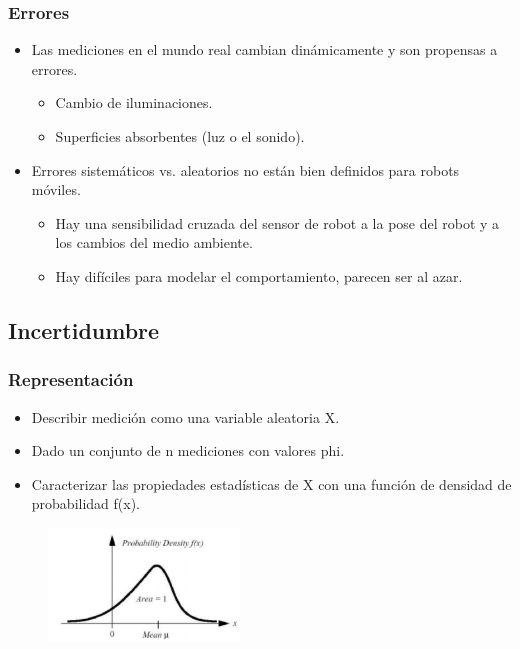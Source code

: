 \documentclass{beamer}
\begin{document}
\begin{frame}
\frametitle{Errores}
\begin{itemize}
\item Las mediciones en el mundo real cambian dinámicamente y son propensas a errores.
\begin{itemize}
\item Cambio de iluminaciones.
\item Superficies absorbentes (luz o el sonido).
\end{itemize}
\item Errores sistemáticos vs. aleatorios no están bien definidos para robots móviles.
\begin{itemize}
\item Hay una sensibilidad cruzada del sensor de robot a la pose del robot y a los cambios del medio ambiente.
\item Hay difíciles para modelar el comportamiento, parecen ser al azar.
\end{itemize}
\end{itemize}
\end{frame}


\subsection{Incertidumbre}

\begin{frame}
\frametitle{Representación}
\begin{itemize}
\item Describir medición como una variable aleatoria X.
\item Dado un conjunto de n mediciones con valores phi.
\item Caracterizar las propiedades estadísticas de X con una función de densidad de probabilidad f(x).
\end{itemize}
\begin{figure}[!h]
\centering
\includegraphics[width=2in]{distri}
\end{figure}
\end{frame}
\end{document}
